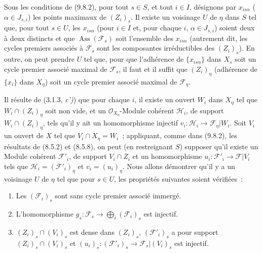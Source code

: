 \begin{proposition}[9.8.3]
\label{IV.9.8.3-fr}
Sous les conditions de \textup{(9.8.2)}, pour tout $s\in S$, et tout $i\in I$, désignons
par $x_{is\alpha}$ \textup{(}$\alpha\in J_{s,i}$\textup{)} les points maximaux de $(Z_i)_s$. Il
existe un voisinage $U$ de $\eta$ dans $S$ tel que, pour tout $s\in U$, les
$x_{is\alpha}$ (pour $i\in I$ et, pour chaque $i$, $\alpha\in J_{s,i}$) soient
deux à deux distincts et que $\operatorname{Ass}(\mathcal F_s)$ soit l'ensemble
des $x_{is\alpha}$ (autrement dit, les cycles premiers associés à $\mathcal F_s$
sont les composantes irréductibles des $(Z_i)_s$). En outre, on peut prendre
$U$ tel que, pour que l'adhérence de $\{x_{is\alpha}\}$ dans $X_s$ soit un cycle
premier associé maximal de $\mathcal F_s$, il faut et il suffit que $(Z_i)_\eta$
(adhérence de $\{x_i\}$ dans $X_\eta$) soit un cycle premier associé maximal de
$\mathcal F_\eta$.
\end{proposition}

Il résulte de (3.1.3, \emph{c')}) que pour chaque $i$, il existe un ouvert $W_i$
dans $X_\eta$ tel que $W_i\cap(Z_i)_\eta$ soit non vide, et un
$\mathcal O_{X_\eta}$-Module cohérent $\mathcal H_i$, de support
$W_i\cap(Z_i)_\eta$, tels qu'il y ait un homomorphisme injectif
$v_i:\mathcal H_i\to\mathcal F_\eta|W_i$. Soit $V_i$ un ouvert de $X$ tel que
$V_i\cap X_\eta=W_i$~; appliquant, comme dans (9.8.2), les résultats de (8.5.2)
et (8.5.8), on peut (en restreignant $S$) supposer qu'il existe un Module
cohérent $\mathcal F'_i$, de support $V_i\cap Z_i$ et un homomorphisme
$u_i:\mathcal F'_i\to\mathcal F|V_i$ tels que
$\mathcal H_i=(\mathcal F'_i)_\eta$ et $v_i=(u_i)_\eta$. Nous allons démontrer
qu'il y a un voisinage $U$ de $\eta$ tel que pour $s\in U$, les propriétés
suivantes soient vérifiées~:
\begin{enumerate}[label=(\roman*)]
  \item Les $(\mathcal F_i)_s$ sont sans cycle premier associé immergé.
  \item L'homomorphisme
  $g_s:\mathcal F_s\to\bigoplus_i(\mathcal F_i)_s$ est injectif.
  \item $(Z_i)_s\cap(V_i)_s$ est dense dans $(Z_i)_s$,
  $(\mathcal F'_i)_s$ a pour support $(Z_i)_s\cap(V_i)_s$ et
  $(u_i)_s:(\mathcal F'_i)_s\to\mathcal F_s|(V_i)_s$ est injectif.
\end{enumerate}



